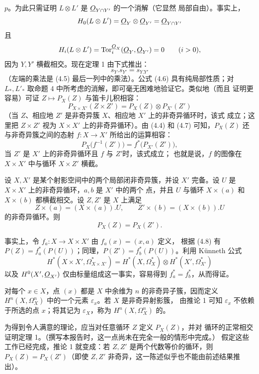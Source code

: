 $p$。为此只需证明 $L\otimes L'$ 是 $\underline{O}_{Y\cap Y'}$ 的一个消解（它显然
局部自由）。事实上，
\[
  H_0(L\otimes L')=\underline{O}_Y\otimes\underline{O}_{Y'}=\underline{O}_{Y\cap Y'}
\]
且
\[
  H_i(L\otimes L')=\operatorname{Tor}_{i}^{\underline{O}_X}(\underline{O}_Y,\underline{O}_{Y'})=0
  \qquad(i>0),
\]
因为 $Y,Y'$ 横截相交。现在定理 1 由下式推出：
\begin{equation}\tag{4.6}
  s_Y.s_{Y'}=s_{Y.Y'}
\end{equation}
（左端的乘法是 (4.5) 最后一列中的乘法）。公式 (4.6) 具有纯局部性质；对
$L_{*},L'_{*}$ 取命题 4 中所考虑的消解，即可毫无困难地验证它。类似地（而且
证明更容易）可证 $Z\longmapsto P_X(Z)$ 与笛卡儿积相容：
\begin{equation}\tag{4.7}
  P_{X\times X'}(Z\times Z')=P_X(Z)\otimes P_{X'}(Z')
\end{equation}
（当 $Z$、相应地 $Z'$ 是非奇异簇 $X$、相应地 $X'$ 上的非奇异循环时，该式
成立；这里把 $Z\times Z'$ 视为 $X\times X'$ 上的非奇异循环）。由 (4.4)
和 (4.7) 可知，$P_X(Z)$ 还与非奇异簇之间的态射
$f:X\longrightarrow X'$ 所给出的运算相容：
\begin{equation}\tag{4.8}
  P_X\bigl(f^{-1}(Z')\bigr)=f^{*}\bigl(P_{X'}(Z')\bigr),
\end{equation}
当 $Z'$ 是 $X'$ 上的非奇异循环且 $f$ 与 $Z'$时，该式成立；
也就是说，$f$ 的图像在 $X\times X'$ 中与循环 $X\times Z'$ 横截。

 设 $X,X'$ 是某个射影空间中的两个局部闭非奇异簇，并设
$X'$ 完备。设 $U$ 是 $X\times X'$ 上的非奇异循环，$a,b$ 是 $X'$ 中的两个
点，并且 $U$ 与循环 $X\times(a)$ 和 $X\times(b)$ 都横截相交。设 $Z,Z'$ 是
$X$ 上满足
\[
  Z\times(a)=(X\times(a)).U,
  \qquad
  Z'\times(b)=(X\times(b)).U
\]
的非奇异循环。则
\[
  P_X(Z)=P_X(Z').
\]

事实上，令 $f_a:X\longrightarrow X\times X'$ 由 $f_a(x)=(x,a)$ 定义，
根据 (4.8) 有 $P(Z)=f_a^{*}(P(U))$；同理，$P(Z')=f_b^{*}(P(U))$。利用
Künneth 公式
\[
  H^{*}(X\times X',\Omega_{X\times X'}^{*})
  =H^{*}(X,\Omega_X^{*})\otimes H^{*}(X',\Omega_{X'}^{*})
\]
以及 $H^{0}(X',\underline{O}_{X'})$ 仅由标量组成这一事实，容易得到
$f_a^{*}=f_b^{*}$，从而得证。

对每个 $x\in X$，点 $(x)$ 都是 $X$ 中余维为 $n$ 的非奇异子簇，因而定义
$H^{n}(X,\Omega_X^{n})$ 中的一个元素 $\varepsilon_x$。若 $X$ 是非奇异射影簇，
由推论 1 可知 $\varepsilon_x$ 不依赖于所选的点 $x$；将其记为
$\varepsilon_X$，称为 $H^{n}(X,\Omega_X^{n})$ 的。

 为得到令人满意的理论，应当对任意循环 $Z$ 定义 $P_X(Z)$，并对
循环的正常相交证明定理 1。（撰写本报告时，这一点尚未在完全一般的情形中完成。）
假定这些工作已经完成，推论 1 就变成：若 $Z,Z'$ 是两个代数等价的循环，则
$P_X(Z)=P_X(Z')$（即使 $Z,Z'$ 非奇异，这一陈述似乎也不能由前述结果推出）。

